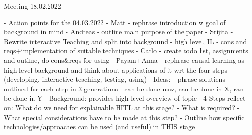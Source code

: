 Meeting 18.02.2022

- Action points for the 04.03.2022
	- Matt - rephrase introduction w goal of background in mind
	- Andreas - outline main purpose of the paper
	- Srijita - Rewrite interactive Teaching and split into background - high level, IL - cons and reqs+implementation of suitable techniques
	- Carlo - create todo list, assignments and outline, do cons&reqs for using
	- Payam+Anna - rephrase causal learning as high level background and think about applications of it wrt the four steps (developing, interactive teaching, testing, using)
- Ideas:
	- phrase solutions outlined for each step in 3 generations - can be done now, can be done in X, can be done in Y
	- Background: provides high-level overview of topic
	- 4 Steps reflect on: What do we need for explainable HITL at this stage?
	    - What is required?
	    - What special considerations have to be made at this step?
	    - Outline how specific technologies/approaches can be used (and useful) in THIS stage